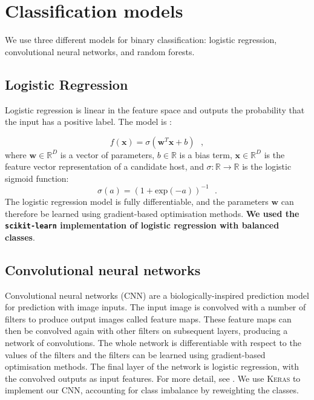 \documentclass[fleqn,usenatbib,usedcolumn]{mnras}
\renewcommand{\vec}[1]{\mathbf{#1}}
\newcommand{\edited}[1]{{\bf {#1}}}
\begin{document}
\appendix

\section{Classification models}\label{app:models}

  We use three different models for binary classification: logistic
  regression, convolutional neural networks, and random forests.

  \subsection{Logistic Regression}
  \label{sec:logistic-regression}
    Logistic regression is linear in the feature space and outputs the
    probability that the input has a positive label. The model is
    \citep{bishop06ml}:

    \begin{equation}
        f(\vec x) = \sigma(\vec w^T \vec x + b) \,\,\,\,,
    \end{equation}
    where $\vec w \in \mathbb{R}^D$ is a vector of parameters, $b \in \mathbb{R}$ is a bias term, $\vec x \in \mathbb{R}^D$ is the feature vector representation of a candidate host, and $\sigma : \mathbb{R} \to \mathbb{R}$ is the logistic sigmoid function: \begin{equation}
        \sigma(a) = (1 + \mathrm{exp}(-a))^{-1}\,\,\,\,.
    \end{equation}%
    The logistic regression model is fully differentiable, and the parameters
    $\vec w$ can therefore be learned using gradient-based optimisation
    methods. \edited{We used the \texttt{scikit-learn} \citep{pedregosa11sklearn}
    implementation of logistic regression with balanced classes}.

  \subsection{Convolutional neural networks}
  \label{sec:convolutional-neural-networks}

    Convolutional neural networks (CNN) are a biologically-inspired prediction
    model for prediction with image inputs. The input image is convolved with
    a number of filters to produce output images called feature maps. These
    feature maps can then be convolved again with other filters on subsequent
    layers, producing a network of convolutions. The whole network is
    differentiable with respect to the values of the filters and the filters
    can be learned using gradient-based optimisation methods. The final layer
    of the network is logistic regression, with the convolved outputs as input
    features. For more detail, see \citet[subsection II.A][]{lecun98}. We use
    \textsc{Keras} \citep{chollet15keras} to implement our CNN, accounting for
    class imbalance by reweighting the classes.
\end{document}
